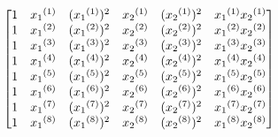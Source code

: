 \documentclass[preview]{standalone}
\begin{document}
\begin{align*}
\special{dvisvgm:raw <g id='unique000'>}\begin{bmatrix}1&{x_{1}}^{(1)}&({x_{1}}^{(1)})^2&{x_{2}}^{(1)}&({x_{2}}^{(1)})^2&{x_{1}}^{(1)}{x_{2}}^{(1)}\\1&{x_{1}}^{(2)}&({x_{1}}^{(2)})^2&{x_{2}}^{(2)}&({x_{2}}^{(2)})^2&{x_{1}}^{(2)}{x_{2}}^{(2)}\\1&{x_{1}}^{(3)}&({x_{1}}^{(3)})^2&{x_{2}}^{(3)}&({x_{2}}^{(3)})^2&{x_{1}}^{(3)}{x_{2}}^{(3)}\\1&{x_{1}}^{(4)}&({x_{1}}^{(4)})^2&{x_{2}}^{(4)}&({x_{2}}^{(4)})^2&{x_{1}}^{(4)}{x_{2}}^{(4)}\\1&{x_{1}}^{(5)}&({x_{1}}^{(5)})^2&{x_{2}}^{(5)}&({x_{2}}^{(5)})^2&{x_{1}}^{(5)}{x_{2}}^{(5)}\\1&{x_{1}}^{(6)}&({x_{1}}^{(6)})^2&{x_{2}}^{(6)}&({x_{2}}^{(6)})^2&{x_{1}}^{(6)}{x_{2}}^{(6)}\\1&{x_{1}}^{(7)}&({x_{1}}^{(7)})^2&{x_{2}}^{(7)}&({x_{2}}^{(7)})^2&{x_{1}}^{(7)}{x_{2}}^{(7)}\\1&{x_{1}}^{(8)}&({x_{1}}^{(8)})^2&{x_{2}}^{(8)}&({x_{2}}^{(8)})^2&{x_{1}}^{(8)}{x_{2}}^{(8)}\end{bmatrix}\special{dvisvgm:raw </g>}
\end{align*}
\end{document}
